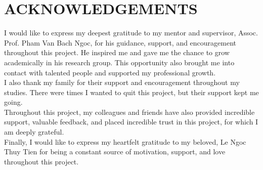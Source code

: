\documentclass{article}
\begin{document}
\renewcommand{\contentsname}{Table of Contents}
\tableofcontents
\newpage

\section*{ACKNOWLEDGEMENTS}
I would like to express my deepest gratitude to my mentor and supervisor, Assoc. Prof. Pham Van Bach Ngoc, for his guidance, support, and encouragement throughout this project. He inspired me and gave me the chance to grow academically in his research group. This opportunity also brought me into contact with talented people and supported my professional growth.\\

I also thank my family for their support and encouragement throughout my studies. There were times I wanted to quit this project, but their support kept me going.\\

Throughout this project, my colleagues and friends have also provided incredible support, valuable feedback, and placed incredible trust in this project, for which I am deeply grateful.\\

Finally, I would like to express my heartfelt gratitude to my beloved, Le Ngoc Thuy Tien for being a constant source of motivation, support, and love throughout this project.\\
\newpage
\end{document}
